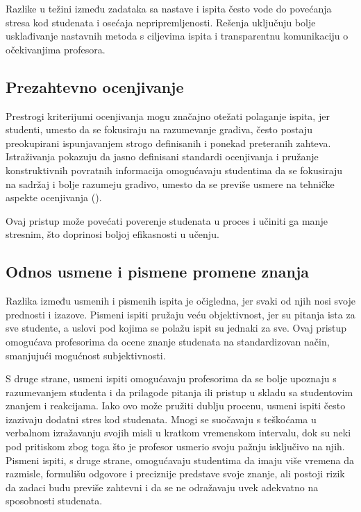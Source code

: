 \documentclass[a4paper]{article}
\begin{document}
Razlike u težini između zadataka sa nastave i ispita često vode do povećanja stresa kod studenata i osećaja nepripremljenosti. Rešenja uključuju bolje usklađivanje nastavnih metoda s ciljevima ispita i transparentnu komunikaciju o očekivanjima profesora.

\subsection{Prezahtevno ocenjivanje}

Prestrogi kriterijumi ocenjivanja mogu značajno otežati polaganje ispita, jer studenti, umesto da se fokusiraju na razumevanje gradiva, često postaju preokupirani ispunjavanjem strogo definisanih i ponekad preteranih zahteva. Istraživanja pokazuju da jasno definisani standardi ocenjivanja i pružanje konstruktivnih povratnih informacija omogućavaju studentima da se fokusiraju na sadržaj i bolje razumeju gradivo, umesto da se previše usmere na tehničke aspekte ocenjivanja (\cite{gamage2022rethinking}). 

Ovaj pristup može povećati poverenje studenata u proces i učiniti ga manje stresnim, što doprinosi boljoj efikasnosti u učenju.

\subsection{Odnos usmene i pismene promene znanja}

Razlika između usmenih i pismenih ispita je očigledna, jer svaki od njih nosi svoje prednosti i izazove. Pismeni ispiti pružaju veću objektivnost, jer su pitanja ista za sve studente, a uslovi pod kojima se polažu ispit su jednaki za sve. Ovaj pristup omogućava profesorima da ocene znanje studenata na standardizovan način, smanjujući mogućnost subjektivnosti.

S druge strane, usmeni ispiti omogućavaju profesorima da se bolje upoznaju s razumevanjem studenta i da prilagode pitanja ili pristup u skladu sa studentovim znanjem i reakcijama. Iako ovo može pružiti dublju procenu, usmeni ispiti često izazivaju dodatni stres kod studenata. Mnogi se suočavaju s teškoćama u verbalnom izražavanju svojih misli u kratkom vremenskom intervalu, dok su neki pod pritiskom zbog toga što je profesor usmerio svoju pažnju isključivo na njih. Pismeni ispiti, s druge strane, omogućavaju studentima da imaju više vremena da razmisle, formulišu odgovore i preciznije predstave svoje znanje, ali postoji rizik da zadaci budu previše zahtevni i da se ne odražavaju uvek adekvatno na sposobnosti studenata.
\end{document}

